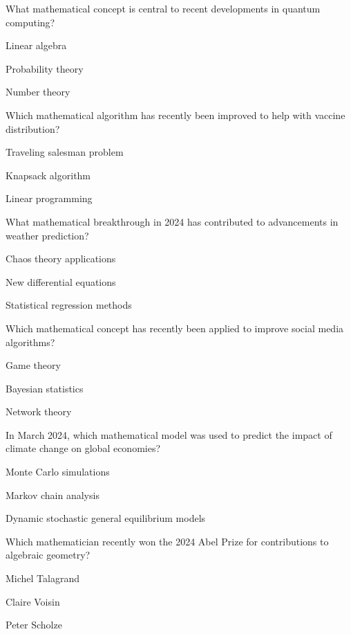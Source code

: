 \begin{enhancedmcq}{What mathematical concept is central to recent developments in quantum computing?}
\item Linear algebra
\item Probability theory
\item Number theory

\end{enhancedmcq}
\begin{enhancedmcq}{Which mathematical algorithm has recently been improved to help with vaccine distribution?}
\item Traveling salesman problem
\item Knapsack algorithm
\item Linear programming

\end{enhancedmcq}
\begin{enhancedmcq}{What mathematical breakthrough in 2024 has contributed to advancements in weather prediction?}
\item Chaos theory applications
\item New differential equations
\item Statistical regression methods

\end{enhancedmcq}
\begin{enhancedmcq}{Which mathematical concept has recently been applied to improve social media algorithms?}
\item Game theory
\item Bayesian statistics
\item Network theory

\end{enhancedmcq}
\begin{enhancedmcq}{In March 2024, which mathematical model was used to predict the impact of climate change on global economies?}
\item Monte Carlo simulations
\item Markov chain analysis
\item Dynamic stochastic general equilibrium models

\end{enhancedmcq}
\begin{enhancedmcq}{Which mathematician recently won the 2024 Abel Prize for contributions to algebraic geometry?}
\item Michel Talagrand
\item Claire Voisin
\item Peter Scholze

\end{enhancedmcq}
